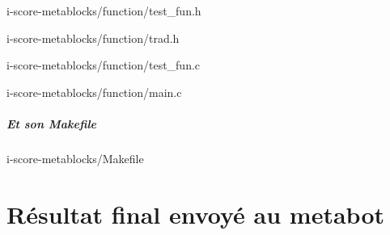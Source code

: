 \documentclass[10pt,a4paper]{report}
\begin{document}
\begin{appendices}

{i-score-metablocks/function/test_fun.h}


{i-score-metablocks/function/trad.h}
\newpage

{i-score-metablocks/function/test_fun.c}


{i-score-metablocks/function/main.c}

\paragraph{Et son Makefile}

{i-score-metablocks/Makefile}

\chapter{Résultat final envoyé au metabot} 



\end{appendices} 
\end{document}
